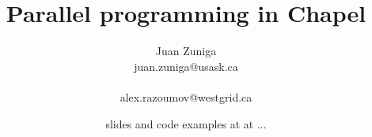 \documentclass[xcolor=svgnames,aspectratio=169]{beamer}
\begin{document}
\title[VisIt Workshop]{\LARGE Parallel programming in Chapel}
\author[]{{\large\sc Juan Zuniga}\\{\small juan.zuniga@usask.ca}\\\\{\small alex.razoumov@westgrid.ca}}
\date[May 2017]{\textcolor{byzantium}{\footnotesize slides and code examples at at ...}}

\begin{frame}
  \titlepage
\end{frame}



\end{document}
